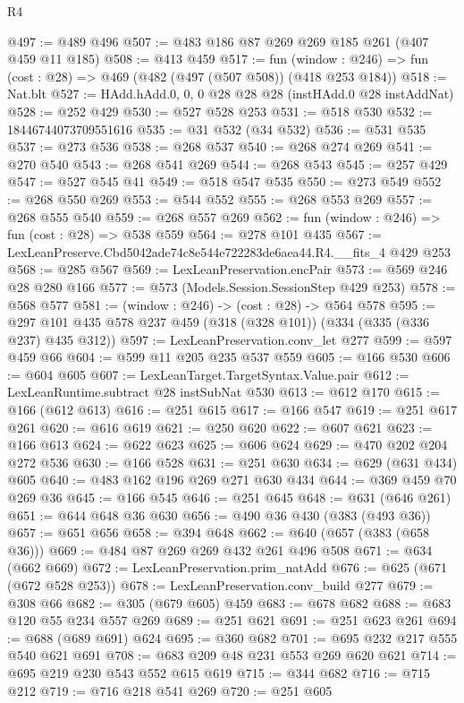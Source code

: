 \begin{lexlean}{R4}
\begin{coremodule}
@497 := @489 @496
@507 := @483 @186 @87 @269 @269 @185 @261 (@407 @459 @11 @185)
@508 := @413 @459
@517 := fun (window : @246) => fun (cost : @28) => @469 (@482 (@497 (@507 @508)) (@418 @253 @184))
@518 := Nat.blt
@527 := HAdd.hAdd.{0, 0, 0} @28 @28 @28 (instHAdd.{0} @28 instAddNat)
@528 := @252 @429
@530 := @527 @528 @253
@531 := @518 @530
@532 := 18446744073709551616
@535 := @31 @532 (@34 @532)
@536 := @531 @535
@537 := @273 @536
@538 := @268 @537
@540 := @268 @274 @269
@541 := @270 @540
@543 := @268 @541 @269
@544 := @268 @543
@545 := @257 @429
@547 := @527 @545 @41
@549 := @518 @547 @535
@550 := @273 @549
@552 := @268 @550 @269
@553 := @544 @552
@555 := @268 @553 @269
@557 := @268 @555 @540
@559 := @268 @557 @269
@562 := fun (window : @246) => fun (cost : @28) => @538 @559
@564 := @278 @101 @435
@567 := LexLeanPreserve.Cbd5042ade74c8e544e722283de6aea44.R4.__fits_4 @429 @253
@568 := @285 @567
@569 := LexLeanPreservation.encPair
@573 := @569 @246 @28 @280 @166
@577 := @573 (Models.Session.SessionStep @429 @253)
@578 := @568 @577
@581 := (window : @246) -> (cost : @28) -> @564 @578
@595 := @297 @101 @435 @578 @237 @459 (@318 (@328 @101)) (@334 (@335 (@336 @237) @435 @312))
@597 := LexLeanPreservation.conv_let @277
@599 := @597 @459 @66
@604 := @599 @11 @205 @235 @537 @559
@605 := @166 @530
@606 := @604 @605
@607 := LexLeanTarget.TargetSyntax.Value.pair
@612 := LexLeanRuntime.subtract @28 instSubNat @530
@613 := @612 @170
@615 := @166 (@612 @613)
@616 := @251 @615
@617 := @166 @547
@619 := @251 @617 @261
@620 := @616 @619
@621 := @250 @620
@622 := @607 @621
@623 := @166 @613
@624 := @622 @623
@625 := @606 @624
@629 := @470 @202 @204 @272 @536
@630 := @166 @528
@631 := @251 @630
@634 := @629 (@631 @434) @605
@640 := @483 @162 @196 @269 @271 @630 @434
@644 := @369 @459 @70 @269 @36
@645 := @166 @545
@646 := @251 @645
@648 := @631 (@646 @261)
@651 := @644 @648 @36 @630
@656 := @490 @36 @430 (@383 (@493 @36))
@657 := @651 @656
@658 := @394 @648
@662 := @640 (@657 (@383 (@658 @36)))
@669 := @484 @87 @269 @269 @432 @261 @496 @508
@671 := @634 (@662 @669)
@672 := LexLeanPreservation.prim_natAdd
@676 := @625 (@671 (@672 @528 @253))
@678 := LexLeanPreservation.conv_build @277
@679 := @308 @66
@682 := @305 (@679 @605) @459
@683 := @678 @682
@688 := @683 @120 @55 @234 @557 @269
@689 := @251 @621
@691 := @251 @623 @261
@694 := @688 (@689 @691) @624
@695 := @360 @682
@701 := @695 @232 @217 @555 @540 @621 @691
@708 := @683 @209 @48 @231 @553 @269 @620 @621
@714 := @695 @219 @230 @543 @552 @615 @619
@715 := @344 @682
@716 := @715 @212
@719 := @716 @218 @541 @269
@720 := @251 @605

\end{coremodule}
\end{lexlean}
